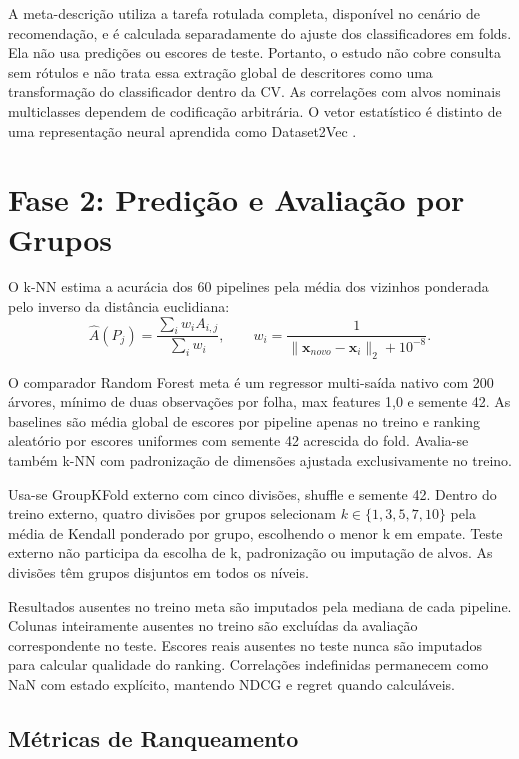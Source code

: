 A meta-descrição utiliza a tarefa rotulada completa, disponível no cenário de recomendação, e é calculada separadamente do ajuste dos classificadores em folds. Ela não usa predições ou escores de teste. Portanto, o estudo não cobre consulta sem rótulos e não trata essa extração global de descritores como uma transformação do classificador dentro da CV. As correlações com alvos nominais multiclasses dependem de codificação arbitrária. O vetor estatístico é distinto de uma representação neural aprendida como Dataset2Vec \cite{Jomaa2021}.

\section{Fase 2: Predição e Avaliação por Grupos}

O k-NN estima a acurácia dos 60 pipelines pela média dos vizinhos ponderada pelo inverso da distância euclidiana:
\begin{equation}\label{eq:knn}
\hat A(P_j)=\frac{\sum_i w_i A_{i,j}}{\sum_i w_i},\qquad
w_i=\frac{1}{\lVert\mathbf{x}_{novo}-\mathbf{x}_i\rVert_2+10^{-8}}.
\end{equation}

O comparador Random Forest meta é um regressor multi-saída nativo com 200 árvores, mínimo de duas observações por folha, max features 1,0 e semente 42. As baselines são média global de escores por pipeline apenas no treino e ranking aleatório por escores uniformes com semente 42 acrescida do fold. Avalia-se também k-NN com padronização de dimensões ajustada exclusivamente no treino.

Usa-se GroupKFold externo com cinco divisões, shuffle e semente 42. Dentro do treino externo, quatro divisões por grupos selecionam $k\in\{1,3,5,7,10\}$ pela média de Kendall ponderado por grupo, escolhendo o menor k em empate. Teste externo não participa da escolha de k, padronização ou imputação de alvos. As divisões têm grupos disjuntos em todos os níveis.

Resultados ausentes no treino meta são imputados pela mediana de cada pipeline. Colunas inteiramente ausentes no treino são excluídas da avaliação correspondente no teste. Escores reais ausentes no teste nunca são imputados para calcular qualidade do ranking. Correlações indefinidas permanecem como NaN com estado explícito, mantendo NDCG e regret quando calculáveis.

\subsection{Métricas de Ranqueamento}

